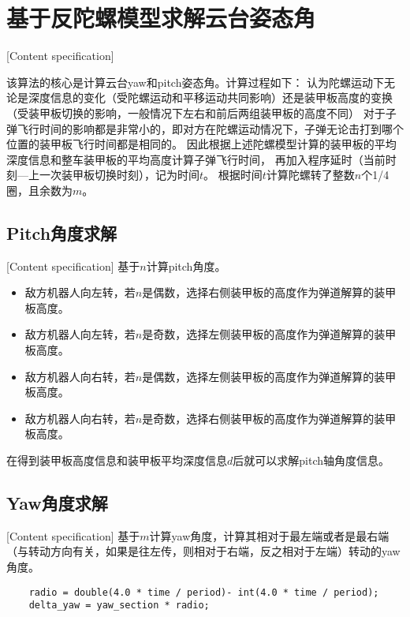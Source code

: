\section{基于反陀螺模型求解云台姿态角}[Content specification]


该算法的核心是计算云台yaw和pitch姿态角。计算过程如下：
认为陀螺运动下无论是深度信息的变化（受陀螺运动和平移运动共同影响）还是装甲板高度的变换（受装甲板切换的影响，一般情况下左右和前后两组装甲板的高度不同）
对于子弹飞行时间的影响都是非常小的，即对方在陀螺运动情况下，子弹无论击打到哪个位置的装甲板飞行时间都是相同的。
因此根据上述陀螺模型计算的装甲板的平均深度信息和整车装甲板的平均高度计算子弹飞行时间，
再加入程序延时（当前时刻—上一次装甲板切换时刻），记为时间$t$。
根据时间$t$计算陀螺转了整数$n$个1/4圈，且余数为$m$。




\subsection{Pitch角度求解}[Content specification]
基于$n$计算pitch角度。
\begin{itemize}[itemindent=2em]
    \item 敌方机器人向左转，若$n$是偶数，选择右侧装甲板的高度作为弹道解算的装甲板高度。
    \item 敌方机器人向左转，若$n$是奇数，选择左侧装甲板的高度作为弹道解算的装甲板高度。
    \item 敌方机器人向右转，若$n$是偶数，选择左侧装甲板的高度作为弹道解算的装甲板高度。
    \item 敌方机器人向右转，若$n$是奇数，选择右侧装甲板的高度作为弹道解算的装甲板高度。
\end{itemize}

在得到装甲板高度信息和装甲板平均深度信息$d$后就可以求解pitch轴角度信息。

\subsection{Yaw角度求解}[Content specification]
基于$m$计算yaw角度，计算其相对于最左端或者是最右端（与转动方向有关，如果是往左传，则相对于右端，反之相对于左端）转动的yaw角度。
\begin{lstlisting}
    radio = double(4.0 * time / period)- int(4.0 * time / period);
    delta_yaw = yaw_section * radio;
\end{lstlisting}

